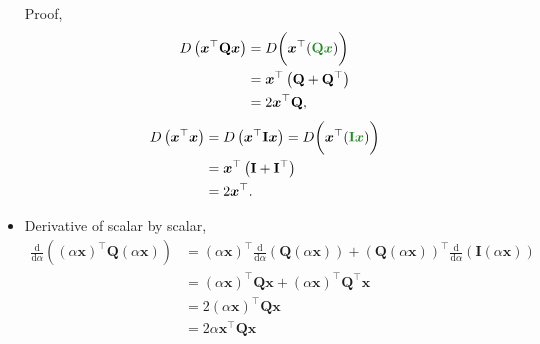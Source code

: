 \documentclass[12pt,thmsa]{article}
\begin{document}
\begin{itemize}
	Proof,
	\[ \begin{aligned}    
		D\left(\boldsymbol{x}^{\top} \mathbf{Q} \boldsymbol{x}\right)    
		&=D \bigg( \boldsymbol{x}^{\top}( {\color{forestgreen}{\mathbf{Q} \boldsymbol{x}}} ) \bigg) \\
		&=\boldsymbol{x}^{\top} \left(\mathbf{Q}+\mathbf{Q}^{\top}\right) \\
		&=2 \boldsymbol{x}^{\top} \mathbf{Q},
	\end{aligned} \]
	\[ \begin{aligned}    
		D\left(\boldsymbol{x}^{\top}  \boldsymbol{x}\right)
		&=D\left(\boldsymbol{x}^{\top} \mathbf{I} \boldsymbol{x}\right) 
		=D \bigg( \boldsymbol{x}^{\top}( {\color{forestgreen}{\mathbf{I} \boldsymbol{x}}} ) \bigg) \\
		&=\boldsymbol{x}^{\top} \left(\mathbf{I}+\mathbf{I}^{\top}\right) \\
		&=2 \boldsymbol{x}^{\top}.
	\end{aligned} \]

	\item Derivative of scalar by scalar,
	\[\begin{aligned}
		\frac{\mathrm{d}}{\mathrm{d} \alpha}\left((\alpha \boldsymbol{x})^{\top} \mathbf{Q}(\alpha \boldsymbol{x})\right) 
		&=(\alpha \boldsymbol{x})^{\top} \frac{\mathrm{d}}{\mathrm{d} \alpha}(\mathbf{Q}(\alpha \boldsymbol{x}))
		+(\mathbf{Q}(\alpha \boldsymbol{x}))^{\top} \frac{\mathrm{d}}{\mathrm{d} \alpha}(\mathbf{I}(\alpha \boldsymbol{x})) \\
		& =(\alpha \boldsymbol{x})^{\top} \mathbf{Q} \boldsymbol{x}+(\alpha \boldsymbol{x})^{\top} \mathbf{Q}^{\top} \boldsymbol{x} \\
		& = 2 (\alpha \boldsymbol{x})^{\top} \mathbf{Q} \boldsymbol{x} \\
		& = 2 \alpha \boldsymbol{x}^{\top} \mathbf{Q} \boldsymbol{x} \\
	\end{aligned}
	\]
\end{itemize}
\end{document}

